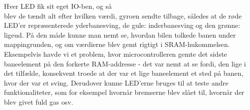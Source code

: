 Hver LED fik sit eget IO-ben, og så \\ blev de tændt alt efter hvilken værdi, gyroen sendte tilbage, således at de røde LED'er repræsenterede yderbanesving, de gule: inderbanesving og den grønne: ligeud. På den måde kunne man nemt se, hvordan bilen tolkede banen under mappingrunden, og om værdierne blev gemt rigtigt i SRAM-hukommelsen.	Eksempelvis havde vi et problem, hvor microcontrolleren gemte det sidste baneelement på den forkerte RAM-addresse - det var nemt at se fordi, den lige i det tilfælde, konsekvent troede at der var et lige baneelement et sted på banen, hvor der var et sving. Derudover kunne LED'erne bruges til at teste andre funktionaliteter, som for eksempel hvornår bremserne blev slået til, hvornår der blev givet fuld gas osv.